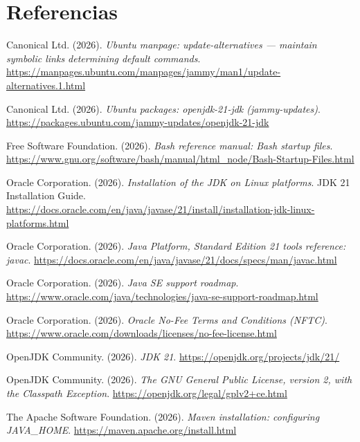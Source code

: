 \section*{Referencias}

\small
\begin{list}{}{%
	\setlength{\leftmargin}{1.2cm}
	\setlength{\itemindent}{-1.2cm}
	\setlength{\itemsep}{0.12em}
	\setlength{\parsep}{0pt}
}

\item Canonical Ltd. (2026). \textit{Ubuntu manpage: update-alternatives --- maintain
symbolic links determining default commands}.
\url{https://manpages.ubuntu.com/manpages/jammy/man1/update-alternatives.1.html}

\item Canonical Ltd. (2026). \textit{Ubuntu packages: openjdk-21-jdk (jammy-updates)}.
\url{https://packages.ubuntu.com/jammy-updates/openjdk-21-jdk}

\item Free Software Foundation. (2026). \textit{Bash reference manual: Bash startup
files}. \url{https://www.gnu.org/software/bash/manual/html_node/Bash-Startup-Files.html}

\item Oracle Corporation. (2026). \textit{Installation of the JDK on Linux platforms}.
JDK 21 Installation Guide.
\url{https://docs.oracle.com/en/java/javase/21/install/installation-jdk-linux-platforms.html}

\item Oracle Corporation. (2026). \textit{Java Platform, Standard Edition 21 tools
reference: javac}.
\url{https://docs.oracle.com/en/java/javase/21/docs/specs/man/javac.html}

\item Oracle Corporation. (2026). \textit{Java SE support roadmap}.
\url{https://www.oracle.com/java/technologies/java-se-support-roadmap.html}

\item Oracle Corporation. (2026). \textit{Oracle No-Fee Terms and Conditions (NFTC)}.
\url{https://www.oracle.com/downloads/licenses/no-fee-license.html}

\item OpenJDK Community. (2026). \textit{JDK 21}. \url{https://openjdk.org/projects/jdk/21/}

\item OpenJDK Community. (2026). \textit{The GNU General Public License, version 2, with
the Classpath Exception}. \url{https://openjdk.org/legal/gplv2+ce.html}

\item The Apache Software Foundation. (2026). \textit{Maven installation: configuring
JAVA\_HOME}. \url{https://maven.apache.org/install.html}

\end{list}
\normalsize
